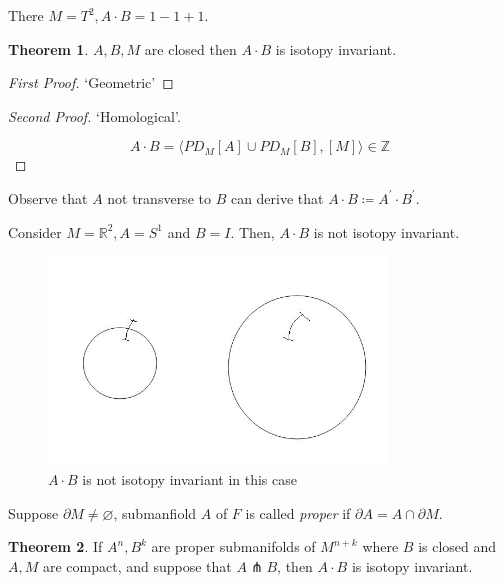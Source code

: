 \documentclass{article}
\theoremstyle{definition}
\newtheorem{theorem}{Theorem}
\begin{document}
    There \(M = T^2, A \cdot B = 1 - 1 + 1\).

    \begin{theorem}
        \(A, B, M\) are closed then \(A \cdot B\) is isotopy invariant.
    \end{theorem}

    \begin{proof}
        [First Proof] `Geometric'
    \end{proof}

    \begin{proof}
        [Second Proof] `Homological'.

        \[
            A \cdot B = \langle PD_M [A] \cup PD_M[B], [M] \rangle \in \mathbb{Z}
        \]
    \end{proof}

    Observe that \(A\) not transverse to \(B\) can derive that \(A \cdot B \coloneqq A^{\prime} \cdot B^{\prime}\).
    
    Consider \(M = \mathbb{R}^2, A = S^1\) and \(B = I\). Then, \(A \cdot B\) is not isotopy invariant.

    \begin{figure}[H]
        \centering
        \includegraphics[width=0.8\textwidth]{img/nonisotopyinvariant}
        \caption{\(A \cdot B\) is not isotopy invariant in this case}
    \end{figure}

    Suppose \(\partial M \neq \varnothing\), submanfiold \(A\) of \(F\) is called \textit{proper} if \(\partial A = A \cap \partial M\).

    \begin{theorem}
        If \(A^n, B^k\) are proper submanifolds of \(M^{n+k}\) where \(B\) is closed and \(A,M\) are compact, and suppose that \(A\pitchfork B\), then \(A \cdot B\) is isotopy invariant.
    \end{theorem}
\end{document}
